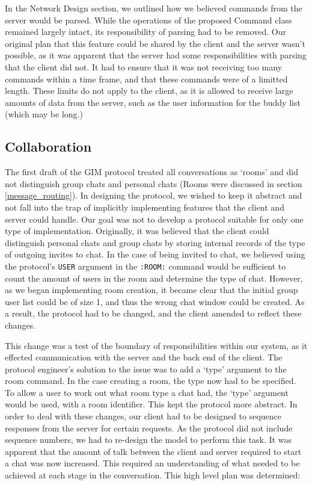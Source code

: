In the Network Design section, we outlined how we believed commands from the server would be parsed. While the operations of the proposed Command class remained largely intact, its responsibility of parsing had to be removed. Our original plan that this feature could be shared by the client and the server wasn't possible, as it was apparent that the server had some responsibilities with parsing that the client did not. It had to ensure that it was not receiving too many commands within a time frame, and that these commands were of a limitted length. These limits do not apply to the client, as it is allowed to receive large amounts of data from the server, such as the user information for the buddy list (which may be long.)


\subsection{Collaboration}
\label{collab}

The first draft of the GIM protocol treated all conversations as `rooms' and did not distinguish group chats and personal chats (Rooms were discussed in section \ref{message_routing}). In designing the protocol, we wished to keep it abstract and not fall into the trap of implicitly implementing features that the client and server could handle. Our goal was not to develop a protocol suitable for only one type of implementation. Originally, it was believed that the client could distinguish personal chats and group chats by storing internal records of the type of outgoing invites to chat. In the case of being invited to chat, we believed using the protocol's \texttt{USER} argument in the \texttt{:ROOM:} command would be sufficient to count the amount of users in the room and determine the type of chat. However, as we began implementing room creation, it became clear that the initial group user list could be of size 1, and thus the wrong chat window could be created. As a result, the protocol had to be changed, and the client amended to reflect these changes. 

This change was a test of the boundary of responsibilities within our system, as it effected communication with the server and the back end of the client. The protocol engineer's solution to the issue was to add a `type' argument to the room command. In the case creating a room, the type now had to be specified. To allow a user to work out what room type a chat had, the `type' argument would be used, with a room identifier. This kept the protocol more abstract. In order to deal with these changes, our client had to be designed to sequence responses from the server for certain requests. As the protocol did not include sequence numbers, we had to re-design the model to perform this task. It was apparent that the amount of talk between the client and server required to start a chat was now increased. This required an understanding of what needed to be achieved at each stage in the conversation. This high level plan was determined:

